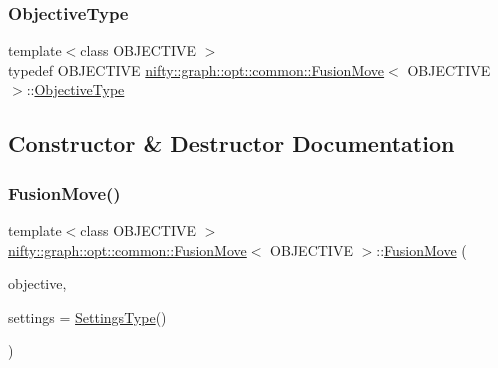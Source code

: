 \subsubsection{\texorpdfstring{Objective\+Type}{ObjectiveType}}
{\footnotesize\ttfamily template$<$class O\+B\+J\+E\+C\+T\+I\+VE $>$ \\
typedef O\+B\+J\+E\+C\+T\+I\+VE \hyperlink{classnifty_1_1graph_1_1opt_1_1common_1_1FusionMove}{nifty\+::graph\+::opt\+::common\+::\+Fusion\+Move}$<$ O\+B\+J\+E\+C\+T\+I\+VE $>$\+::\hyperlink{classnifty_1_1graph_1_1opt_1_1common_1_1FusionMove_a8e60c3d0397b2a2b49bdc8f302a65d93}{Objective\+Type}}



\subsection{Constructor \& Destructor Documentation}
\mbox{\label{classnifty_1_1graph_1_1opt_1_1common_1_1FusionMove_a9959f5a6aeaae5cccd0d6f7630a14196}} 
\subsubsection{\texorpdfstring{Fusion\+Move()}{FusionMove()}}
{\footnotesize\ttfamily template$<$class O\+B\+J\+E\+C\+T\+I\+VE $>$ \\
\hyperlink{classnifty_1_1graph_1_1opt_1_1common_1_1FusionMove}{nifty\+::graph\+::opt\+::common\+::\+Fusion\+Move}$<$ O\+B\+J\+E\+C\+T\+I\+VE $>$\+::\hyperlink{classnifty_1_1graph_1_1opt_1_1common_1_1FusionMove}{Fusion\+Move} (\begin{DoxyParamCaption}\item[{const \hyperlink{classnifty_1_1graph_1_1opt_1_1common_1_1FusionMove_a8e60c3d0397b2a2b49bdc8f302a65d93}{Objective\+Type} \&}]{objective,  }\item[{const \hyperlink{structnifty_1_1graph_1_1opt_1_1common_1_1FusionMove_1_1SettingsType}{Settings\+Type} \&}]{settings = {\ttfamily \hyperlink{structnifty_1_1graph_1_1opt_1_1common_1_1FusionMove_1_1SettingsType}{Settings\+Type}()} }\end{DoxyParamCaption})\hspace{0.3cm}{\ttfamily [inline]}}



